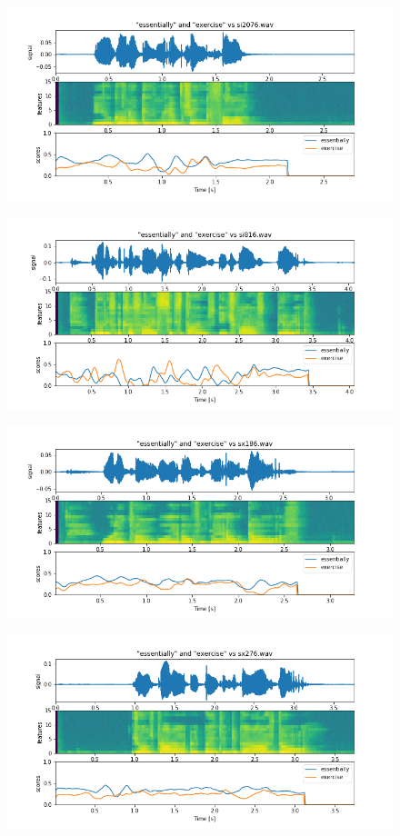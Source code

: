 \documentclass[11pt]{article}
\begin{document}
\begin{figure}[H]
	\includegraphics[width=\linewidth]{./docs/si2076.png}
\end{figure}
\begin{figure}[H]
	\includegraphics[width=\linewidth]{./docs/si816.png}
\end{figure}
\begin{figure}[H]
	\includegraphics[width=\linewidth]{./docs/sx186.png}
\end{figure}
\begin{figure}[H]
	\includegraphics[width=\linewidth]{./docs/sx276.png}
\end{figure}
\end{document}
